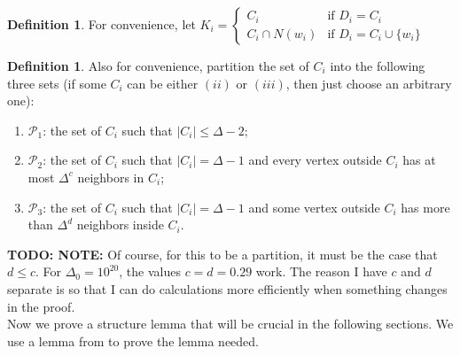 \documentclass[12pt]{article}
\theoremstyle{definition}
\newtheorem{definition}[theorem]{Definition}
\begin{document}

\begin{definition}
For convenience, let 
$K_i=
\begin{cases}
C_i & \mbox{if }D_i=C_i \\
C_i\cap N(w_i) & \mbox{if } D_i=C_i\cup\{w_i\}
\end{cases}$
\end{definition}

\begin{definition}
Also for convenience, partition the set of $C_i$ into the following three sets (if some $C_i$ can be either $(ii)$ or $(iii)$, then just choose an arbitrary one):
\begin{enumerate}[$(i)$]
\item $\mathcal{P}_1$: the set of $C_i$ such that $|C_i|\leq \Delta-2$;
\item $\mathcal{P}_2$: the set of $C_i$ such that $|C_i|=\Delta-1$ and every vertex outside $C_i$ has at most $\Delta^c$ neighbors in $C_i$;
\item $\mathcal{P}_3$: the set of $C_i$ such that $|C_i|=\Delta-1$ and some vertex outside $C_i$ has more than $\Delta^d$ neighbors inside $C_i$. 
\end{enumerate}
\end{definition}

{\bf TODO: NOTE:} Of course, for this to be a partition, it must be the case that $d\leq c$. For $\Delta_0=10^{20}$, the values $c=d=0.29$ work. The reason I have $c$ and $d$ separate is so that I can do calculations more efficiently when something changes in the proof. \\

Now we prove a structure lemma that will be crucial in the following sections. We use a lemma from \cite{CR12} to prove the lemma needed.
\end{document}
